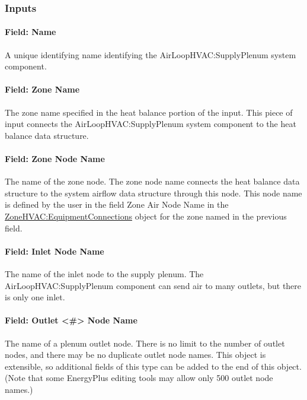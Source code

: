 \subsubsection{Inputs}\label{inputs-3-002}

\paragraph{Field: Name}\label{field-name-3-002}

A unique identifying name identifying the AirLoopHVAC:SupplyPlenum system component.

\paragraph{Field: Zone Name}\label{field-zone-name-1}

The zone name specified in the heat balance portion of the input. This piece of input connects the AirLoopHVAC:SupplyPlenum system component to the heat balance data structure.

\paragraph{Field: Zone Node Name}\label{field-zone-node-name-1}

The name of the zone node. The zone node name connects the heat balance data structure to the system airflow data structure through this node. This node name is defined by the user in the field Zone Air Node Name in the \hyperref[zonehvacequipmentconnections]{ZoneHVAC:EquipmentConnections} object for the zone named in the previous field.

\paragraph{Field: Inlet Node Name}\label{field-inlet-node-name-1}

The name of the inlet node to the supply plenum. The AirLoopHVAC:SupplyPlenum component can send air to many outlets, but there is only one inlet.

\paragraph{Field: Outlet \textless{}\#\textgreater{} Node Name}\label{field-outlet-node-name-1-000}

The name of a plenum outlet node. There is no limit to the number of outlet nodes, and there may be no duplicate outlet node names.  This object is extensible, so additional fields of this type can be added to the end of this object. (Note that some EnergyPlus editing tools may allow only 500 outlet node names.)

